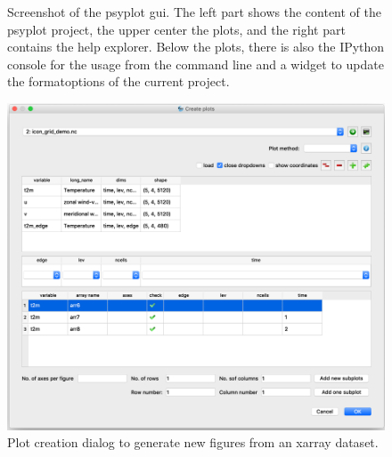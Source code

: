 \begin{refsection}
\begin{figure}
	\caption[Screenshot of the psyplot GUI]{Screenshot of the psyplot \gls{gui}. The left part shows the content of the psyplot project, the upper center the plots, and the right part contains the help explorer. Below the plots, there is also the IPython console for the usage from the command line and a widget to update the formatoptions of the current project.}
	\label{fig:psyplot-gui}
\end{figure}

\begin{figure}
	\centering
	\includegraphics[width=0.7\linewidth]{psyplot-figures/plot-creator.png}
	\caption[psyplot Gui plot creation dialog]{Plot creation dialog to generate new figures from an xarray dataset.}
	\label{fig:psyplot-gui-plot-creator}
\end{figure}


\end{refsection}
